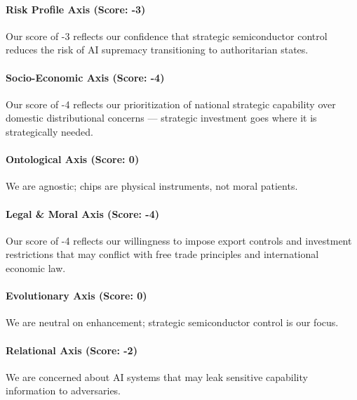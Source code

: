 \paragraph{Risk Profile Axis (Score:
-3)}\label{risk-profile-axis-score--3-2}

Our score of -3 reflects our confidence that strategic semiconductor
control reduces the risk of AI supremacy transitioning to authoritarian
states.

\paragraph{Socio-Economic Axis (Score:
-4)}\label{socio-economic-axis-score--4}

Our score of -4 reflects our prioritization of national strategic
capability over domestic distributional concerns --- strategic
investment goes where it is strategically needed.

\paragraph{Ontological Axis (Score:
0)}\label{ontological-axis-score-0-9}

We are agnostic; chips are physical instruments, not moral patients.

\paragraph{Legal \& Moral Axis (Score:
-4)}\label{legal-moral-axis-score--4-3}

Our score of -4 reflects our willingness to impose export controls and
investment restrictions that may conflict with free trade principles and
international economic law.

\paragraph{Evolutionary Axis (Score:
0)}\label{evolutionary-axis-score-0-4}

We are neutral on enhancement; strategic semiconductor control is our
focus.

\paragraph{Relational Axis (Score:
-2)}\label{relational-axis-score--2-2}

We are concerned about AI systems that may leak sensitive capability
information to adversaries.


